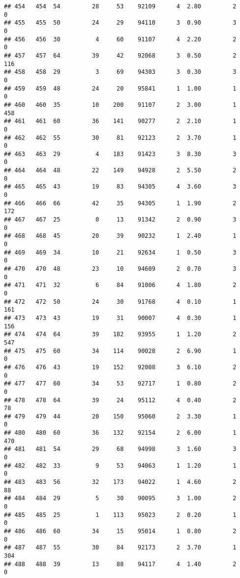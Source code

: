 \documentclass[
]{article}
\begin{document}
\begin{verbatim}
## 454   454  54         28     53    92109      4  2.80         2        0
## 455   455  50         24     29    94110      3  0.90         3        0
## 456   456  30          4     60    91107      4  2.20         2        0
## 457   457  64         39     42    92068      3  0.50         2      116
## 458   458  29          3     69    94303      3  0.30         3        0
## 459   459  48         24     20    95841      1  1.00         1        0
## 460   460  35         10    200    91107      2  3.00         1      458
## 461   461  60         36    141    90277      2  2.10         1        0
## 462   462  55         30     81    92123      2  3.70         1        0
## 463   463  29          4    183    91423      3  8.30         3        0
## 464   464  48         22    149    94928      2  5.50         2        0
## 465   465  43         19     83    94305      4  3.60         3        0
## 466   466  66         42     35    94305      1  1.90         2      172
## 467   467  25          0     13    91342      2  0.90         3        0
## 468   468  45         20     39    90232      1  2.40         1        0
## 469   469  34         10     21    92634      1  0.50         3        0
## 470   470  48         23     10    94609      2  0.70         3        0
## 471   471  32          6     84    91006      4  1.80         2        0
## 472   472  50         24     30    91768      4  0.10         1      161
## 473   473  43         19     31    90007      4  0.30         1      156
## 474   474  64         39    182    93955      1  1.20         2      547
## 475   475  60         34    114    90028      2  6.90         1        0
## 476   476  43         19    152    92008      3  6.10         2        0
## 477   477  60         34     53    92717      1  0.80         2        0
## 478   478  64         39     24    95112      4  0.40         2       78
## 479   479  44         20    150    95060      2  3.30         1        0
## 480   480  60         36    132    92154      2  6.00         1      470
## 481   481  54         29     68    94998      3  1.60         3        0
## 482   482  33          9     53    94063      1  1.20         1        0
## 483   483  56         32    173    94022      1  4.60         2       88
## 484   484  29          5     30    90095      3  1.00         2        0
## 485   485  25          1    113    95023      2  0.20         1        0
## 486   486  60         34     15    95014      1  0.80         2        0
## 487   487  55         30     84    92173      2  3.70         1      304
## 488   488  39         13     88    94117      4  1.40         2        0

\end{verbatim}
\end{document}
